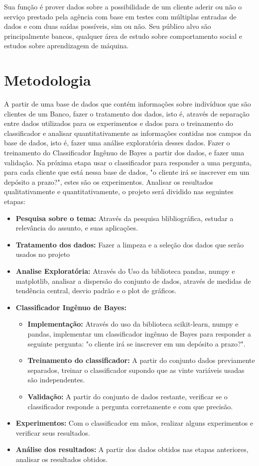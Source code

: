 \documentclass[conference]{IEEEtran}
\begin{document}
Sua função é prover dados sobre a possibilidade de um cliente aderir ou não o serviço prestado pela agência com base em testes com múltiplas entradas de dados e com duas saídas possíveis, sim ou não. Seu público alvo são principalmente bancos, qualquer área de estudo sobre comportamento social e estudos sobre aprendizagem de máquina.
\section{Metodologia}

A partir de uma base de dados que contém informações sobre indivíduos que são clientes de um Banco, fazer o tratamento dos dados, isto é, através de separação entre dados utilizados para os experimentos e dados para o treinamento do classificador e analisar quantitativamente as informações contidas nos campos da base de dados, isto é, fazer uma análise exploratória desses dados. 
Fazer o treinamento do Classificador Ingênuo de Bayes a partir dos dados, e fazer uma validação. Na próxima etapa usar o classificador para responder a uma pergunta, para cada cliente que está nessa base de dados, "o cliente irá se inscrever em um depósito a prazo?", estes são os experimentos. Analisar os resultados qualitativamente e quantitativamente, o projeto será dividido nas seguintes etapas:
\begin{itemize}
\item \textbf{Pesquisa sobre o tema:}
Através da pesquisa blibliográfica, estudar  a relevância do assunto, e suas aplicações.
\item \textbf{Tratamento dos dados:}
Fazer a limpeza e a seleção dos dados que serão usados no projeto
\item \textbf{Analise Exploratória:}
Através do Uso da biblioteca pandas, numpy e matplotlib, analisar a dispersão do conjunto de dados,
através de medidas de tendência central, desvio padrão e o plot de gráficos.

\item \textbf{Classificador Ingênuo de Bayes:}
    \begin{itemize}
        \item \textbf{Implementação:}
        Através do uso da biblioteca scikit-learn, numpy e pandas, implementar um classificador ingênuo de Bayes
        para responder a seguinte pergunta: "o cliente irá se inscrever em um depósito a prazo?".
        \item \textbf{Treinamento do classificador:}
        A partir do conjunto dados previamente separados, treinar o classificador supondo que as vinte variáveis usadas são independentes.
        \item \textbf{Validação:}
        A partir do conjunto de dados restante, verificar se o classificador responde a pergunta corretamente e com que precisão.
    \end{itemize}
\item \textbf{Experimentos:}
Com o classificador em mãos, realizar alguns experimentos e verificar seus resultados.
\item \textbf{Análise dos resultados:}
A partir dos dados obtidos nas etapas anteriores, analisar os resultados obtidos.
\end{itemize}
\end{document}
